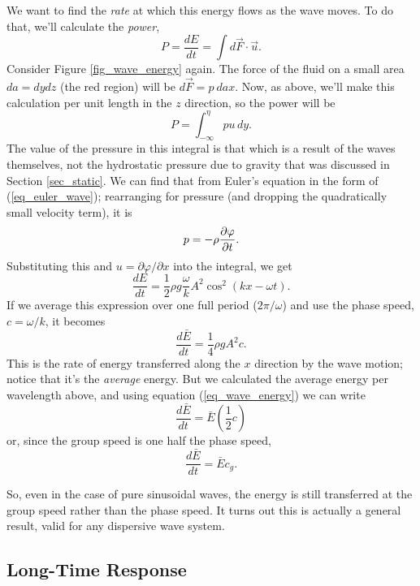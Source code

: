 We want to find the \emph{rate} at which this energy flows as the wave moves.  To do that, we'll calculate the \emph{power}, 
\[
P = \frac{dE}{dt} = \int d\vec{F} \cdot \vec{u}.
\]
Consider Figure \ref{fig_wave_energy} again.  The force of the fluid on a small area $da = dy dz$ (the red region) will be $d\vec{F} = p \ da \unit{x}$.  Now, as above, we'll make this calculation per unit length in the $z$ direction, so the power will be
\begin{equation}
P = \int_{-\infty}^\eta pu \, dy.
\end{equation}
The value of the pressure in this integral is that which is a result of the waves themselves, not the hydrostatic pressure due to gravity that was discussed in Section \ref{sec_static}.  We can find that from Euler's equation in the form of (\ref{eq_euler_wave}); rearranging for pressure (and dropping the quadratically small velocity term), it is
\begin{equation}
p = -\rho \frac{\partial {\varphi}}{\partial {t}}.
\end{equation}
Substituting this and $u = \partial \varphi / \partial x$ into the integral, we get
\[
\frac{dE}{dt} = \frac{1}{2} \rho g \frac{\omega}{k} A^2 \cos^2(kx -\omega t).
\]
If we average this expression over one full period ($2\pi / \omega$) and use the phase speed, $c = \omega / k$, it becomes
\begin{equation}
\frac{d\bar{E}}{dt} = \frac{1}{4} \rho g A^2 c.
\end{equation}
This is the rate of energy transferred along the $x$ direction by the wave motion; notice that it's the \emph{average} energy.  But we calculated the average energy per wavelength above, and using equation (\ref{eq_wave_energy}) we can write
\[
\frac{d\bar{E}}{dt} = \bar{E} \left( \frac{1}{2} c \right)
\]
or, since the group speed is one half the phase speed,
\begin{equation}
\frac{d\bar{E}}{dt} = \bar{E} c_g.
\end{equation}

So, even in the case of pure sinusoidal waves, the energy is still transferred at the group speed rather than the phase speed.  It turns out this is actually a general result, valid for any dispersive  wave system.


\subsection{Long-Time Response}


